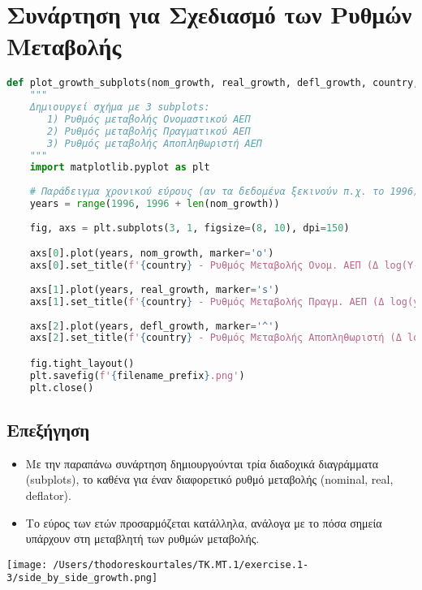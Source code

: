 \documentclass{book}
\begin{document}
\section{Συνάρτηση για Σχεδιασμό των Ρυθμών Μεταβολής}
\begin{tcolorbox}[colback=white,colframe=black,title=Παραγωγή Τριών Subplots για Κάθε Περιοχή/Χώρα]
\begin{lstlisting}[language=Python]
def plot_growth_subplots(nom_growth, real_growth, defl_growth, country, filename_prefix='plot'):
    """
    Δημιουργεί σχήμα με 3 subplots:
       1) Ρυθμός μεταβολής Ονομαστικού ΑΕΠ
       2) Ρυθμός μεταβολής Πραγματικού ΑΕΠ
       3) Ρυθμός μεταβολής Αποπληθωριστή ΑΕΠ
    """
    import matplotlib.pyplot as plt
    
    # Παράδειγμα χρονικού εύρους (αν τα δεδομένα ξεκινούν π.χ. το 1996)
    years = range(1996, 1996 + len(nom_growth))
    
    fig, axs = plt.subplots(3, 1, figsize=(8, 10), dpi=150)

    axs[0].plot(years, nom_growth, marker='o')
    axs[0].set_title(f'{country} - Ρυθμός Μεταβολής Ονομ. ΑΕΠ (Δ log(Yₜ))')
    
    axs[1].plot(years, real_growth, marker='s')
    axs[1].set_title(f'{country} - Ρυθμός Μεταβολής Πραγμ. ΑΕΠ (Δ log(yₜ))')
    
    axs[2].plot(years, defl_growth, marker='^')
    axs[2].set_title(f'{country} - Ρυθμός Μεταβολής Αποπληθωριστή (Δ log(Pₜ))')

    fig.tight_layout()
    plt.savefig(f'{filename_prefix}.png')
    plt.close()
\end{lstlisting}
\end{tcolorbox}

\subsection*{Επεξήγηση}
\begin{itemize}
  \item Με την παραπάνω συνάρτηση δημιουργούνται τρία διαδοχικά διαγράμματα (subplots), το καθένα για έναν διαφορετικό ρυθμό μεταβολής (nominal, real, deflator).
  \item Το εύρος των ετών προσαρμόζεται κατάλληλα, ανάλογα με το πόσα σημεία υπάρχουν στη μεταβλητή των ρυθμών μεταβολής.
\end{itemize}
\begin{tcolorbox}[colback=white,colframe=black,title= Διάγραμμα Ρυθμών Μεταβολής]
  \centering
  \texttt{[image: /Users/thodoreskourtales/TK.MT.1/exercise.1-3/side\_by\_side\_growth.png]}
  \vspace{0.5em}
\end{tcolorbox}
\end{document}
